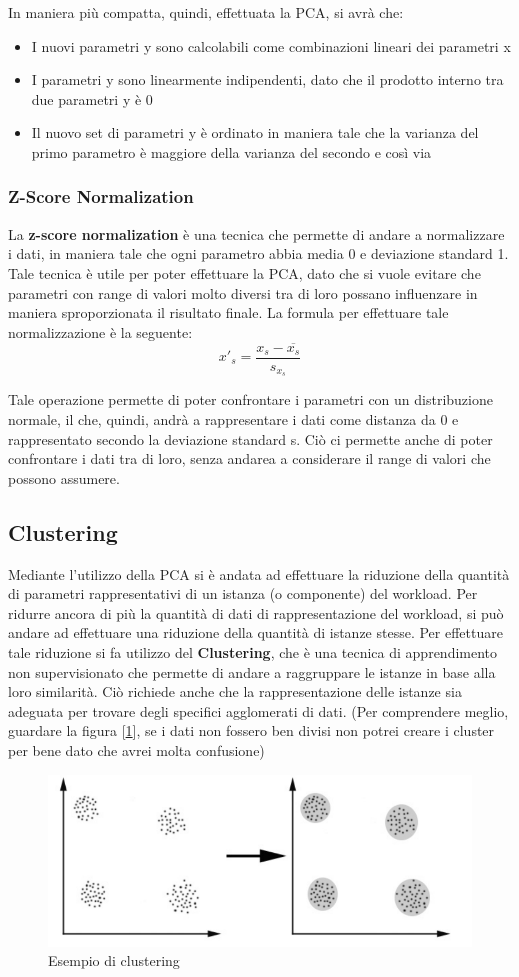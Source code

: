 In maniera più compatta, quindi, effettuata la PCA, si avrà che:
\begin{itemize}
    \item I nuovi parametri y sono calcolabili come combinazioni lineari dei parametri x
    \item I parametri y sono linearmente indipendenti, dato che il prodotto interno tra due parametri y è 0
    \item Il nuovo set di parametri y è ordinato in maniera tale che la varianza del primo parametro è maggiore della varianza del secondo e così via
\end{itemize}

\subsubsection{Z-Score Normalization}
La \textbf{z-score normalization} è una tecnica che permette di andare a normalizzare i dati, in maniera tale che ogni parametro abbia media 0 e deviazione standard 1. Tale tecnica è utile per poter effettuare la PCA, dato che si vuole evitare che parametri con range di valori molto diversi tra di loro possano influenzare in maniera sproporzionata il risultato finale. La formula per effettuare tale normalizzazione è la seguente:
\[
x'_s = \frac{x_{s} - \overline{x_s}}{s_{x_s}}
\]

Tale operazione permette di poter confrontare i parametri con un distribuzione normale, il che, quindi, andrà a rappresentare i dati come distanza da 0 e rappresentato secondo la deviazione standard s. Ciò ci permette anche di poter confrontare i dati tra di loro, senza andarea a considerare il range di valori che possono assumere.

\subsection{Clustering}
Mediante l'utilizzo della PCA si è andata ad effettuare la riduzione della quantità di parametri rappresentativi di un istanza (o componente) del workload. Per ridurre ancora di più la quantità di dati di rappresentazione del workload, si può andare ad effettuare una riduzione della quantità di istanze stesse. Per effettuare tale riduzione si fa utilizzo del \textbf{Clustering}, che è una tecnica di apprendimento non supervisionato che permette di andare a raggruppare le istanze in base alla loro similarità. Ciò richiede anche che la rappresentazione delle istanze sia adeguata per trovare degli specifici agglomerati di dati. (Per comprendere meglio, guardare la figura [\ref{img:clustering}], se i dati non fossero ben divisi non potrei creare i cluster per bene dato che avrei molta confusione)

\begin{figure}[h]
\centering
\includegraphics[width=.6\textwidth]{img/clustering.png}
\caption{Esempio di clustering}\label{img:clustering}
\end{figure}
